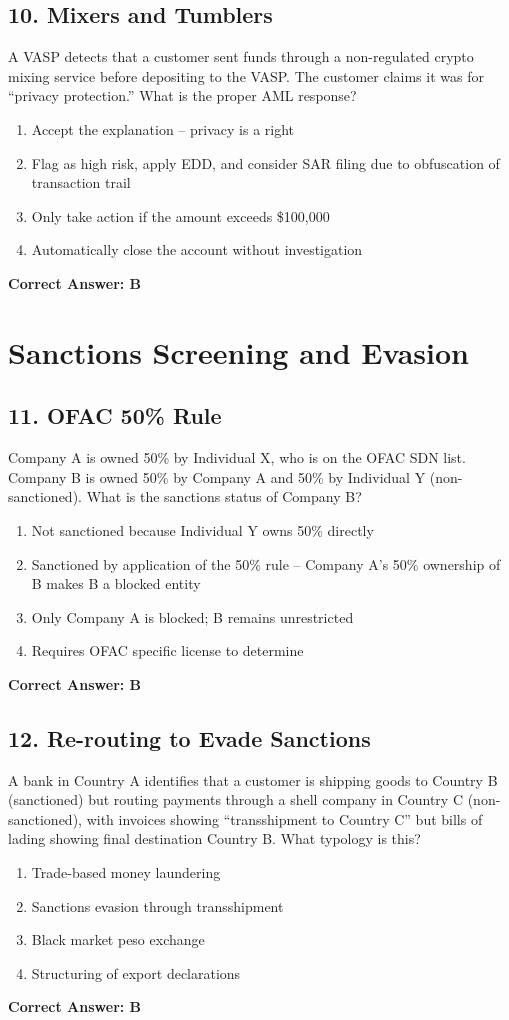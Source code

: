 \documentclass[11pt,a4paper]{article}
\begin{document}
	\subsection{10. Mixers and Tumblers}
	A VASP detects that a customer sent funds through a non-regulated crypto mixing service before depositing to the VASP. The customer claims it was for “privacy protection.” What is the proper AML response?
	\begin{enumerate}[label=\Alph*.]
		\item Accept the explanation – privacy is a right
		\item Flag as high risk, apply EDD, and consider SAR filing due to obfuscation of transaction trail
		\item Only take action if the amount exceeds \$100,000
		\item Automatically close the account without investigation
	\end{enumerate}
	\textbf{Correct Answer: B}
	
	\section{Sanctions Screening and Evasion}
	
	\subsection{11. OFAC 50\% Rule}
	Company A is owned 50\% by Individual X, who is on the OFAC SDN list. Company B is owned 50\% by Company A and 50\% by Individual Y (non-sanctioned). What is the sanctions status of Company B?
	\begin{enumerate}[label=\Alph*.]
		\item Not sanctioned because Individual Y owns 50\% directly
		\item Sanctioned by application of the 50\% rule – Company A’s 50\% ownership of B makes B a blocked entity
		\item Only Company A is blocked; B remains unrestricted
		\item Requires OFAC specific license to determine
	\end{enumerate}
	\textbf{Correct Answer: B}
	
	\subsection{12. Re-routing to Evade Sanctions}
	A bank in Country A identifies that a customer is shipping goods to Country B (sanctioned) but routing payments through a shell company in Country C (non-sanctioned), with invoices showing “transshipment to Country C” but bills of lading showing final destination Country B. What typology is this?
	\begin{enumerate}[label=\Alph*.]
		\item Trade-based money laundering
		\item Sanctions evasion through transshipment
		\item Black market peso exchange
		\item Structuring of export declarations
	\end{enumerate}
	\textbf{Correct Answer: B}
	
\end{document}
